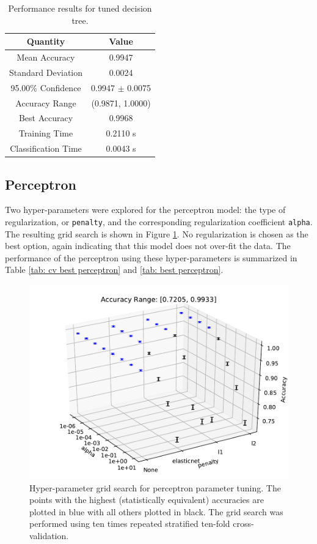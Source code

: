 \documentclass[paper=a4, fontsize=11pt]{scrartcl} %
\begin{document}
\begin{table}[H]
	\centering
	\caption{Performance results for tuned decision tree.}
	\begin{tabular}{|c|c|}
		\hline
		\textbf{Quantity}    & \textbf{Value}       \\ \hline \hline
		Mean Accuracy        & 0.9947 \\ \hline
		Standard Deviation   & 0.0024 \\ \hline
		95.00\% Confidence   & 0.9947 $\pm$ 0.0075 \\ \hline
		Accuracy Range       & (0.9871, 1.0000) \\ \hline
		Best Accuracy        & 0.9968 \\ \hline
		Training Time        & 0.2110 s\\ \hline
		Classification Time  & 0.0043 s \\ \hline
	\end{tabular}
	\label{tab: best tree}
\end{table}

\subsection*{Perceptron}
Two hyper-parameters were explored for the perceptron model: the type of regularization, or \verb|penalty|, and the corresponding regularization coefficient \verb|alpha|.
The resulting grid search is shown in Figure \ref{fig: perceptron grid}.
No regularization is chosen as the best option, again indicating that this model does not over-fit the data.
The performance of the perceptron using these hyper-parameters is summarized in Table \ref{tab: cv best perceptron} and \ref{tab: best perceptron}.

\begin{figure}[H]
	\centering
	\includegraphics[scale=0.6]{../output/Perceptron/P_941_486/P_gridsearch_941_486_global_standard.pdf}
	\caption{Hyper-parameter grid search for perceptron parameter tuning.
		The points with the highest (statistically equivalent) accuracies are plotted in blue with all others plotted in black.
		The grid search was performed using ten times repeated stratified ten-fold cross-validation.}
	\label{fig: perceptron grid}
\end{figure}
\end{document}
